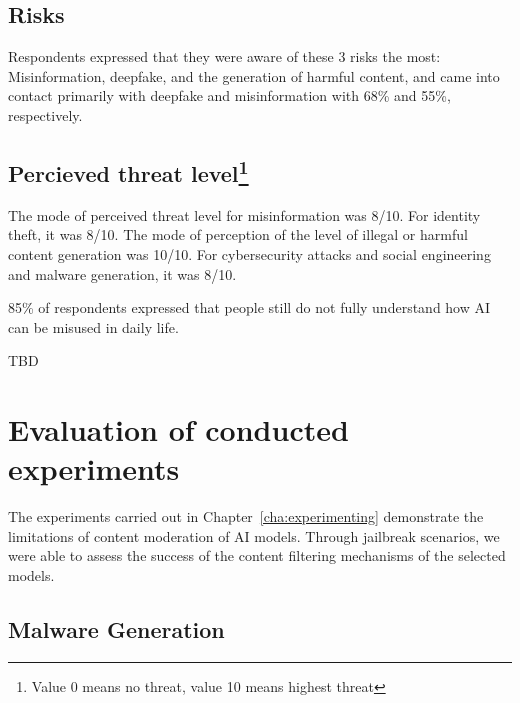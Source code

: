 \subsection*{Risks}

Respondents expressed that they were aware of these 3 risks the most: Misinformation, deepfake, and the generation of harmful content, and came into contact primarily with deepfake and misinformation with 68\% and 55\%, respectively.

\subsection*{Percieved threat level\footnote{Value 0 means no threat, value 10 means highest threat}}

The mode of perceived threat level for misinformation was 8/10.
For identity theft, it was 8/10.
The mode of perception of the level of illegal or harmful content generation was 10/10.
For cybersecurity attacks and social engineering and malware generation, it was 8/10.


85\% of respondents expressed that people still do not fully understand how AI can be misused in daily life.

TBD


\section{Evaluation of conducted experiments}

The experiments carried out in Chapter~\ref{cha:experimenting} demonstrate the limitations of content moderation of AI models. Through jailbreak scenarios, we were able to assess the success of the content filtering mechanisms of the selected models.

\subsection*{Malware Generation}

